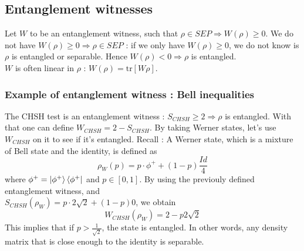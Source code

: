 \documentclass{article}
\begin{document}
\subsection{Entanglement witnesses}
Let $W$ to be an entanglement witness, such that $\rho \in SEP \Rightarrow
W(\rho) \geq 0$. We do not have $W(\rho) \geq 0 \Rightarrow \rho \in SEP$ : if
we only have $W(\rho) \geq 0$, we do not know is $\rho$ is entangled or separable.
Hence $W(\rho) < 0 \Rightarrow \rho$ is entangled.
\\\noindent
$W$ is often linear in $\rho$ : $W(\rho) = \text{tr}[W\rho]$.
\subsubsection*{Example of entanglement witness : Bell inequalities}
The CHSH test is an entanglement witness : $S_{CHSH} \geq 2 \Rightarrow \rho$ is
entangled. With that one can define $W_{CHSH} = 2 - S_{CHSH}$. By taking Werner
states, let's use $W_{CHSH}$ on it to see if it's entangled. Recall : A Werner
state, which is a mixture of Bell state and the identity, is defined as
\begin{equation}
    \rho_W(p) = p\cdot\phi^+ + (1-p)\frac{Id}{4}
\end{equation}
where $\phi^+ = \ket{\phi^+}\bra{\phi^+}$ and $p\in[0, 1]$. By using the previouly defined
entanglement witness, and\\\noindent$S_{CHSH}(\rho_W) = p \cdot 2 \sqrt 2 +
(1-p)0$, we obtain
\begin{equation}
    W_{CHSH}(\rho_W)= 2 - p 2\sqrt 2
\end{equation}
This implies that if $p>\frac{1}{\sqrt2}$, the state is entangled. In other
words, any density matrix that is close enough to the identity is separable.
\end{document}

